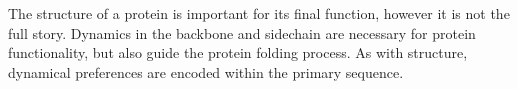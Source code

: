 The structure of a protein is important for its final function,
however it is not the full story.
Dynamics in the backbone and sidechain are necessary for protein functionality,
but also guide the protein folding process.
As with structure,
dynamical preferences are encoded within the primary sequence.
